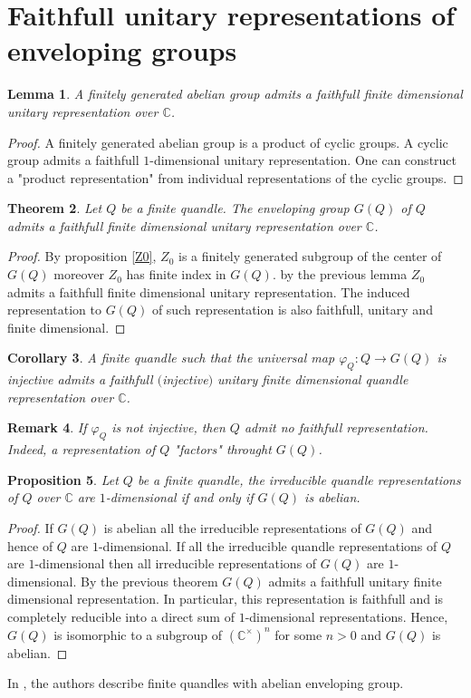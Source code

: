 \documentclass[12pt, reqno]{amsart}
\newtheorem{theorem}{Theorem}[section]
\newtheorem{proposition}[theorem]{Proposition}
\newtheorem{corollary}[theorem]{Corollary}
\newtheorem{remark}[theorem]{Remark}
\newtheorem{lemma}[theorem]{Lemma}
\begin{document}
\section{Faithfull unitary representations of enveloping groups}
\begin{lemma}
A finitely generated abelian group admits a faithfull finite dimensional unitary representation over $\mathbb{C}$.
\end{lemma}
\begin{proof}
A finitely generated abelian group is a product of cyclic groups. A cyclic group admits a faithfull $1$-dimensional unitary representation. One can construct a "product representation" from individual representations of the cyclic groups.
\end{proof}
\begin{theorem}
Let $Q$ be a finite quandle. The enveloping group $G(Q)$ of $Q$ admits a faithfull finite dimensional unitary representation over $\mathbb{C}$.
\end{theorem}
\begin{proof}
By proposition \ref{Z0}, $Z_0$ is a finitely generated subgroup of the center of $G(Q)$ moreover $Z_0$ has finite index in $G(Q)$. by the previous lemma $Z_0$ admits a faithfull finite dimensional unitary representation. The induced representation to $G(Q)$ of such representation is also faithfull, unitary and finite dimensional.  
\end{proof}
\begin{corollary}
A finite quandle such that the universal map $\varphi_Q :Q\to G(Q)$ is injective admits a faithfull $($injective$)$ unitary finite dimensional quandle representation over $\mathbb{C}$.
\end{corollary}
\begin{remark}
If $\varphi_Q$ is not injective, then $Q$ admit no faithfull representation. Indeed, a representation of $Q$ "factors" throught $G(Q)$.
\end{remark}
\begin{proposition}
Let $Q$ be a finite quandle, the irreducible quandle representations of $Q$ over $\mathbb{C}$ are $1$-dimensional if and only if $G(Q)$ is abelian.
\end{proposition}
\begin{proof}
If $G(Q)$ is abelian all the irreducible representations of $G(Q)$ and hence of $Q$ are $1$-dimensional. If all the irreducible quandle representations of $Q$ are $1$-dimensional then all irreducible representations of $G(Q)$ are $1$-dimensional. By the previous theorem $G(Q)$ admits a faithfull unitary finite dimensional representation. In particular, this representation is faithfull and is completely reducible into a direct sum of $1$-dimensional representations. Hence, $G(Q)$ is isomorphic to a subgroup of $(\mathbb{C}^\times)^n$ for some $n>0$ and $G(Q)$ is abelian.
\end{proof}
In \cite{ab}, the authors describe finite quandles with abelian enveloping group.
\end{document}
